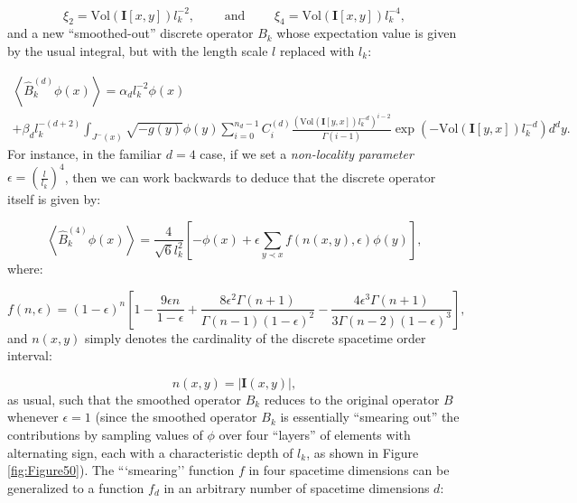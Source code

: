 \documentclass{article}
\begin{document}
\begin{equation}
\xi_2 = \mathrm{Vol} \left( \mathbf{I} \left[ x, y \right] \right) l_{k}^{-2}, \qquad \text{ and } \qquad \xi_4 = \mathrm{Vol} \left( \mathbf{I} \left[ x, y \right] \right) l_{k}^{-4},
\end{equation}
and a new ``smoothed-out'' discrete operator ${B_k}$ whose expectation value is given by the usual integral, but with the length scale $l$ replaced with ${l_k}$:

\begin{multline}
\left\langle \hat{B}_{k}^{\left( d \right)} \phi \left( x \right) \right\rangle = \alpha_d l_{k}^{-2} \phi \left( x \right)\\
+ \beta_d l_{k}^{- \left( d + 2 \right)} \int_{J^{-} \left( x \right)} \sqrt{- g\left( y \right)} \phi \left( y \right) \sum_{i = 0}^{n_d - 1} C_{i}^{\left( d \right)} \frac{\left( \mathrm{Vol} \left( \mathbf{I} \left[ y, x \right] \right) l_{k}^{-d} \right)^{i - 2}}{\Gamma \left( i - 1 \right)} \exp \left( - \mathrm{Vol} \left( \mathbf{I} \left[ y, x \right] \right) l_{k}^{-d} \right) d^d y.
\end{multline}
For instance, in the familiar ${d = 4}$ case, if we set a \textit{non-locality parameter} ${\epsilon = \left( \frac{l}{l_k} \right)^4}$, then we can work backwards to deduce that the discrete operator itself is given by:

\begin{equation}
\left\langle \hat{B}_{k}^{\left( 4 \right)} \phi \left( x \right) \right\rangle = \frac{4}{\sqrt{6} l_{k}^{2}} \left[ - \phi \left( x \right) + \epsilon \sum_{y \prec x} f \left( n \left( x, y \right), \epsilon \right) \phi \left( y \right) \right],
\end{equation}
where:

\begin{equation}
f \left( n, \epsilon \right) = \left( 1 - \epsilon \right)^{n} \left[ 1 - \frac{9 \epsilon n}{1 - \epsilon} + \frac{8 \epsilon^2 \Gamma \left( n + 1 \right)}{\Gamma \left( n - 1 \right) \left( 1 - \epsilon \right)^2} - \frac{4 \epsilon^3 \Gamma \left( n + 1 \right)}{3 \Gamma \left( n - 2 \right) \left( 1 - \epsilon \right)^3} \right],
\end{equation}
and ${n \left( x, y \right)}$ simply denotes the cardinality of the discrete spacetime order interval:

\begin{equation}
n \left( x, y \right) = \left\lvert \mathbf{I} \left( x, y \right) \right\rvert,
\end{equation}
as usual, such that the smoothed operator ${B_k}$ reduces to the original operator ${B}$ whenever ${\epsilon = 1}$ (since the smoothed operator ${B_k}$ is essentially ``smearing out'' the contributions by sampling values of ${\phi}$ over four ``layers'' of elements with alternating sign, each with a characteristic depth of ${l_k}$, as shown in Figure \ref{fig:Figure50}). The ```smearing'' function $f$ in four spacetime dimensions can be generalized to a function ${f_d}$ in an arbitrary number of spacetime dimensions $d$:
\end{document}
